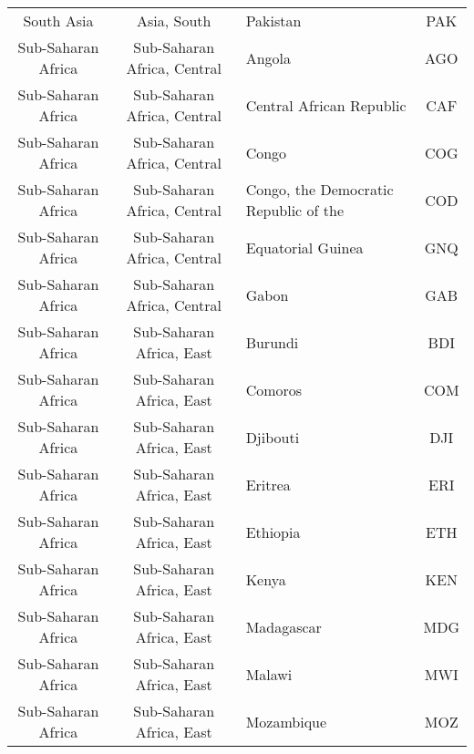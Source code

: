 \begin{landscape}
\begin{longtable}{|c|c|p{5cm}|c|}
                    South Asia &                  Asia, South &                                          Pakistan &  PAK \\
            Sub-Saharan Africa &  Sub-Saharan Africa, Central &                                            Angola &  AGO \\
            Sub-Saharan Africa &  Sub-Saharan Africa, Central &                          Central African Republic &  CAF \\
            Sub-Saharan Africa &  Sub-Saharan Africa, Central &                                             Congo &  COG \\
            Sub-Saharan Africa &  Sub-Saharan Africa, Central &    \raggedright  Congo, the Democratic Republic of the &  COD \\
            Sub-Saharan Africa &  Sub-Saharan Africa, Central &                                 Equatorial Guinea &  GNQ \\
            Sub-Saharan Africa &  Sub-Saharan Africa, Central &                                             Gabon &  GAB \\
            Sub-Saharan Africa &     Sub-Saharan Africa, East &                                           Burundi &  BDI \\
            Sub-Saharan Africa &     Sub-Saharan Africa, East &                                           Comoros &  COM \\
            Sub-Saharan Africa &     Sub-Saharan Africa, East &                                          Djibouti &  DJI \\
            Sub-Saharan Africa &     Sub-Saharan Africa, East &                                           Eritrea &  ERI \\
            Sub-Saharan Africa &     Sub-Saharan Africa, East &                                          Ethiopia &  ETH \\
            Sub-Saharan Africa &     Sub-Saharan Africa, East &                                             Kenya &  KEN \\
            Sub-Saharan Africa &     Sub-Saharan Africa, East &                                        Madagascar &  MDG \\
            Sub-Saharan Africa &     Sub-Saharan Africa, East &                                            Malawi &  MWI \\
            Sub-Saharan Africa &     Sub-Saharan Africa, East &                                        Mozambique &  MOZ \\

\end{longtable}
\end{landscape}
